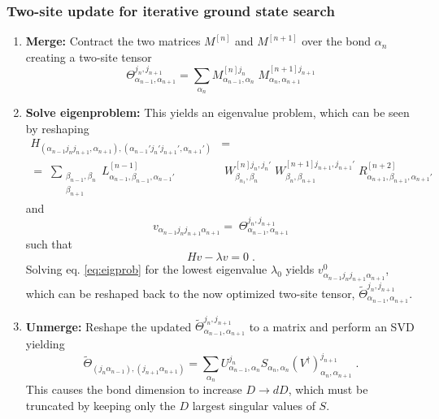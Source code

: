 \subsubsection{Two-site update for iterative ground state search}
\begin{enumerate}
\item
\textbf{Merge:} Contract the two matrices $M^{[n]}$ and $M^{[n+1]}$ over the bond $\alpha_{n}$ creating a two-site tensor
\begin{equation}
\Theta_{\alpha_{n-1} , \alpha_{n+1}}^{j_n , j_{n+1}} = \sum_{\alpha_n} M_{\alpha_{n-1} , \alpha_{n}}^{[n] j_n } \;  M_{\alpha_{n} , \alpha_{n+1}}^{[n+1] j_{n+1} } 
\end{equation}

\item
\textbf{Solve eigenproblem:} This yields an eigenvalue problem, which can be seen by reshaping
\begin{align}
	H_{( \alpha_{n-1}  j_n  j_{n+1}, \alpha_{n+1}),(\alpha_{n-1}'  j_n '  j_{n+1}', \alpha_{n+1}')} &= \nonumber \\
	= \; \sum_{\substack{\beta_{n-1} , \beta_n \\ \beta_{n+1}}} L_{\alpha_{n-1}, \beta_{n-1} , \alpha_{n-1} '}^{[n-1]} & \; W_{\beta_{n_1}, \beta_n}^{[n] j_n , j_n '} \; W_{\beta_{n}, \beta_{n+1}}^{[n+1] j_{n+1} , j_{n+1} '}\;  R_{\alpha_{n+1} ,\beta_{n+1} , \alpha_{n+1} '}^{[n+2]} 
\end{align}
and
\begin{equation}
	v_{ \alpha_{n-1} j_n j_{n+1} \alpha_{n+1}} = \; \Theta_{\alpha_{n-1} , \alpha_{n+1}}^{j_n , j_{n+1}}
\end{equation}
such that
\begin{equation}
	H v - \lambda v = 0 \; .
	\label{eq:eigprob}
\end{equation}
Solving eq. \eqref{eq:eigprob} for the lowest eigenvalue $\lambda_0$ yields $v_{ \alpha_{n-1} j_n j_{n+1} \alpha_{n+1}}^0$, which can be reshaped back to the now optimized two-site tensor, $\tilde{\Theta}_{\alpha_{n-1} , \alpha_{n+1}}^{j_n , j_{n+1}}$.

\item
\textbf{Unmerge:} Reshape the updated $\tilde{\Theta}_{\alpha_{n-1} , \alpha_{n+1}}^{j_n , j_{n+1}}$ to a matrix and perform an SVD yielding
\begin{equation}
	\tilde{\Theta}_{(j_n \alpha_{n-1} ) ,(j_{n+1}  \alpha_{n+1} )} = \sum_{\alpha_n} U_{\alpha_{n-1} , \alpha_{n}}^{j_n} S_{\alpha_n , \alpha_n} (V^{\dag})_{\alpha_{n} , \alpha_{n+1}}^{j_{n+1}} \; .
\end{equation}
This causes the bond dimension to increase $D \rightarrow d D$, which must be truncated by keeping only the $D$ largest singular values of $S$. 


\end{enumerate}
